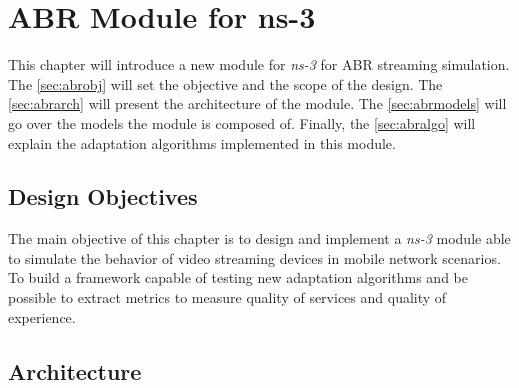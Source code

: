 \chapter{ABR Module for ns-3}
\label{chap:abrmodule}

This chapter will introduce a new module for \textit{ns-3} for ABR streaming simulation.
The \autoref{sec:abrobj} will set the objective and the scope of the design. 
The \autoref{sec:abrarch} will present the architecture of the module.
The \autoref{sec:abrmodels} will go over the models the module is composed of.
Finally, the \autoref{sec:abralgo} will explain the adaptation algorithms implemented in this module.


\section{Design Objectives}
\label{sec:abrobj}
The main objective of this chapter is to design and implement a \textit{ns-3} module able 
to simulate the behavior of video streaming devices in mobile network scenarios. To build 
a framework capable of testing new adaptation algorithms and be possible to extract metrics 
to measure quality of services and quality of experience.

\section{Architecture}
\label{sec:abrarch}

